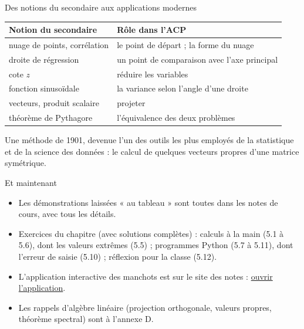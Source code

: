 \begin{frame}{Des notions du secondaire aux applications modernes}
  \small
  \begin{center}
  \begin{tabular}{ll}
    \toprule
    Notion du secondaire & Rôle dans l'ACP \\
    \midrule
    nuage de points, corrélation & le point de départ ; la forme du nuage \\
    droite de régression & un point de comparaison avec l'axe principal \\
    cote $z$ & réduire les variables \\
    fonction sinusoïdale & la variance selon l'angle d'une droite \\
    vecteurs, produit scalaire & projeter \\
    théorème de Pythagore & l'équivalence des deux problèmes \\
    \bottomrule
  \end{tabular}
  \end{center}
  \vspace{6pt}
  Une méthode de 1901, devenue l'un des outils les plus employés de la
  statistique et de la science des données : le calcul de quelques vecteurs
  propres d'une matrice symétrique.
\end{frame}

\begin{frame}{Et maintenant}
  \begin{itemize}
    \item Les démonstrations laissées « au tableau » sont toutes dans les
      notes de cours, avec tous les détails.
    \item Exercices du chapitre (avec solutions complètes) : calculs à la
      main (5.1 à 5.6), dont les valeurs extrêmes (5.5) ; programmes Python
      (5.7 à 5.11), dont l'erreur de saisie (5.10) ; réflexion pour la
      classe (5.12).
    \item L'application interactive des manchots est sur le site des notes :
      \href{\urlappli}{\color{sectioncolor}ouvrir l'application}.
    \item Les rappels d'algèbre linéaire (projection orthogonale, valeurs
      propres, théorème spectral) sont à l'annexe D.
  \end{itemize}
\end{frame}
